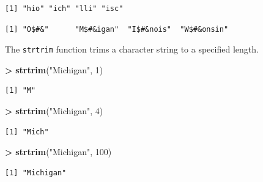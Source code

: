 \documentclass[
]{krantz}
\makeatletter
\newenvironment{Shaded}{\begin{snugshade}}{\end{snugshade}}
\newcommand{\DecValTok}[1]{\textcolor[rgb]{0.06,0.06,0.06}{#1}}
\newcommand{\KeywordTok}[1]{\textcolor[rgb]{0.27,0.27,0.27}{\textbf{#1}}}
\newcommand{\NormalTok}[1]{#1}
\newcommand{\OperatorTok}[1]{\textcolor[rgb]{0.43,0.43,0.43}{\textbf{#1}}}
\newcommand{\StringTok}[1]{\textcolor[rgb]{0.5,0.5,0.5}{#1}}
\newenvironment{kframe}{%
\medskip{}
\setlength{\fboxsep}{.8em}
 \def\at@end@of@kframe{}%
 \ifinner\ifhmode%
  \def\at@end@of@kframe{\end{minipage}}%
  \begin{minipage}{\columnwidth}%
 \fi\fi%
 \def\FrameCommand##1{\hskip\@totalleftmargin \hskip-\fboxsep
 \colorbox{shadecolor}{##1}\hskip-\fboxsep
     \hskip-\linewidth \hskip-\@totalleftmargin \hskip\columnwidth}%
 \MakeFramed {\advance\hsize-\width
   \@totalleftmargin\z@ \linewidth\hsize
   \@setminipage}}%
 {\par\unskip\endMakeFramed%
 \at@end@of@kframe}
\renewenvironment{Shaded}{\begin{kframe}}{\end{kframe}}
\makeatother
\begin{document}
\begin{verbatim}
[1] "hio" "ich" "lli" "isc"
\end{verbatim}

\begin{Shaded}
\end{Shaded}

\begin{verbatim}
[1] "O$#&"      "M$#&igan"  "I$#&nois"  "W$#&onsin"
\end{verbatim}

The \texttt{strtrim} function trims a character string to a specified length.

\begin{Shaded}
\begin{Highlighting}[]
\OperatorTok{\textgreater{}}\StringTok{ }\KeywordTok{strtrim}\NormalTok{(}\StringTok{"Michigan"}\NormalTok{, }\DecValTok{1}\NormalTok{)}
\end{Highlighting}
\end{Shaded}

\begin{verbatim}
[1] "M"
\end{verbatim}

\begin{Shaded}
\begin{Highlighting}[]
\OperatorTok{\textgreater{}}\StringTok{ }\KeywordTok{strtrim}\NormalTok{(}\StringTok{"Michigan"}\NormalTok{, }\DecValTok{4}\NormalTok{)}
\end{Highlighting}
\end{Shaded}

\begin{verbatim}
[1] "Mich"
\end{verbatim}

\begin{Shaded}
\begin{Highlighting}[]
\OperatorTok{\textgreater{}}\StringTok{ }\KeywordTok{strtrim}\NormalTok{(}\StringTok{"Michigan"}\NormalTok{, }\DecValTok{100}\NormalTok{)}
\end{Highlighting}
\end{Shaded}

\begin{verbatim}
[1] "Michigan"
\end{verbatim}
\end{document}
